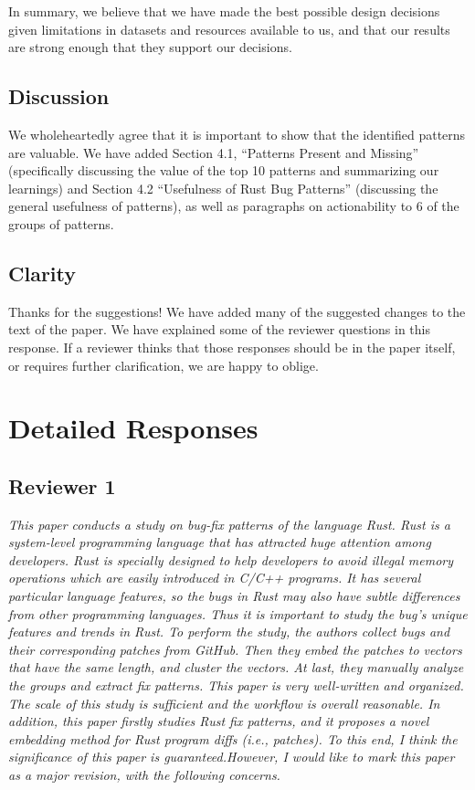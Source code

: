 \documentclass{article}
\begin{document}
In summary, we believe that we have made the best possible design decisions given limitations in datasets and resources available to us, and that our results are strong enough that they support our decisions.

\subsection{Discussion}

We wholeheartedly agree that it is important to show that the identified patterns are valuable. We have added Section 4.1, “Patterns Present and Missing” (specifically discussing the value of the top 10 patterns and summarizing our learnings) and Section 4.2 “Usefulness of Rust Bug Patterns” (discussing the general usefulness of patterns), as well as paragraphs on actionability to 6 of the groups of patterns. 

\subsection{Clarity}

Thanks for the suggestions! We have added many of the suggested changes to the text of the paper. We have explained some of the reviewer questions in this response. If a reviewer thinks that those responses should be in the paper itself, or requires further clarification, we are happy to oblige.

\section{Detailed Responses}

\subsection{Reviewer 1}

\textit{This paper conducts a study on bug-fix patterns of the language Rust. Rust is a system-level programming language that has attracted huge attention among developers. Rust is specially designed to help developers to avoid illegal memory operations which are easily introduced in C/C++ programs. It has several particular language features, so the bugs in Rust may also have subtle differences from other programming languages. Thus it is important to study the bug's unique features and trends in Rust.
To perform the study, the authors collect bugs and their corresponding patches from GitHub. Then they embed the patches to vectors that have the same length, and cluster the vectors. At last, they manually analyze the groups and extract fix patterns.
This paper is very well-written and organized. The scale of this study is sufficient and the workflow is overall reasonable. In addition, this paper firstly studies Rust fix patterns, and it proposes a novel embedding method for Rust program diffs (i.e., patches). To this end, I think the significance of this paper is guaranteed.However, I would like to mark this paper as a major revision, with the following concerns.}
\end{document}
